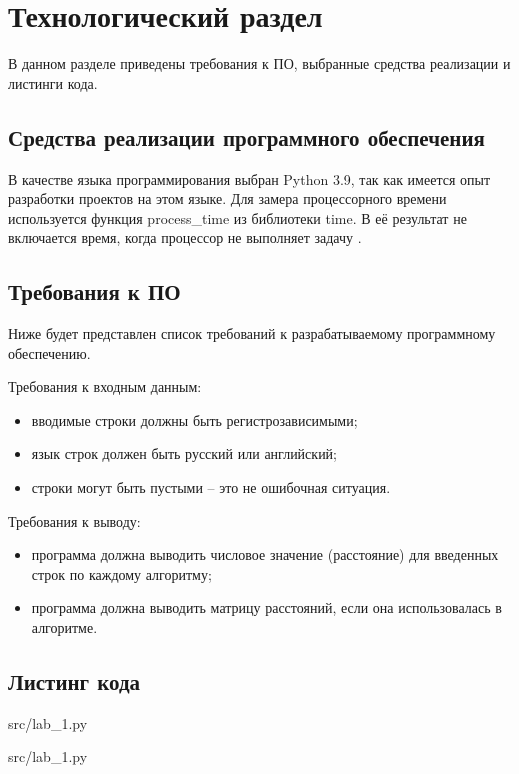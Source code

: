 \chapter{Технологический раздел}
В данном разделе приведены требования к ПО, выбранные средства реализации и листинги кода.
\section{Средства реализации программного обеспечения}
В качестве языка программирования выбран Python 3.9, так как имеется опыт разработки проектов на этом языке.
Для замера процессорного времени используется функция process\_time из библиотеки time. В её результат не включается время, когда процессор не выполняет задачу \cite{python}. 

\section{Требования к ПО}
Ниже будет представлен список требований к разрабатываемому программному обеспечению. 

Требования к входным данным: 
\begin{itemize}
	\item вводимые строки должны быть регистрозависимыми;
	\item язык строк должен быть русский или английский;
	\item строки могут быть пустыми -- это не ошибочная ситуация.
\end{itemize}

Требования к выводу: 
\begin{itemize}
	\item программа должна выводить числовое значение (расстояние) для введенных строк по каждому алгоритму;
	\item программа должна выводить матрицу расстояний, если она использовалась в алгоритме.
\end{itemize} 

\section{Листинг кода}
\begin{lstinputlisting}[language=Python, caption=Рекурсивная реализация алгоритма поиска расстояния Левенштейна, linerange={3-16}, basicstyle=\small\sffamily, frame=single]{src/lab_1.py}
\end{lstinputlisting}

\begin{lstinputlisting}[language=Python, caption=Рекурсивная реализация (с матрицей) алгоритма поиска расстояния Левенштейна, linerange={17-38}, basicstyle=\small\sffamily, frame=single]{src/lab_1.py}
\end{lstinputlisting}

